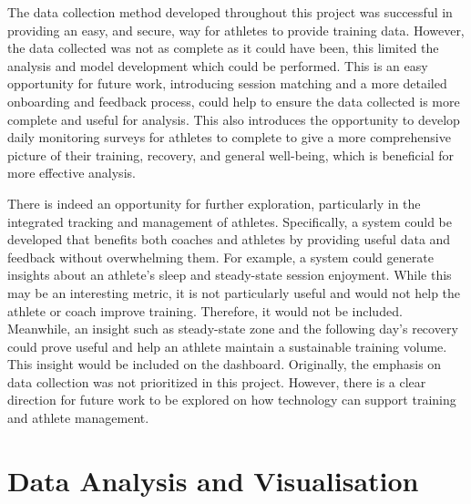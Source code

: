The data collection method developed throughout this project was successful in providing an easy, and secure, way for athletes to provide training data. However, the data collected was not as complete as it could have been, this limited the analysis and model development which could be performed. This is an easy opportunity for future work, introducing session matching and a more detailed onboarding and feedback process, could help to ensure the data collected is more complete and useful for analysis. This also introduces the opportunity to develop daily monitoring surveys for athletes to complete to give a more comprehensive picture of their training, recovery, and general well-being, which is beneficial for more effective analysis.

There is indeed an opportunity for further exploration, particularly in the integrated tracking and management of athletes. Specifically, a system could be developed that benefits both coaches and athletes by providing useful data and feedback without overwhelming them. For example, a system could generate insights about an athlete's sleep and steady-state session enjoyment. While this may be an interesting metric, it is not particularly useful and would not help the athlete or coach improve training. Therefore, it would not be included. Meanwhile, an insight such as steady-state zone and the following day's recovery could prove useful and help an athlete maintain a sustainable training volume. This insight would be included on the dashboard. Originally, the emphasis on data collection was not prioritized in this project. However, there is a clear direction for future work to be explored on how technology can support training and athlete management.

\section{\label{sec:data-anyl-diss}Data Analysis and Visualisation}
